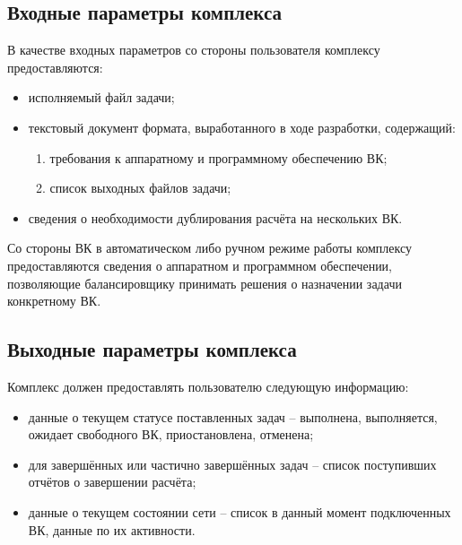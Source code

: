 \documentclass[a4paper,12pt]{report}
\numberwithin{equation}{section}
\begin{document}
\subsection{Входные параметры комплекса}
В качестве входных параметров со стороны пользователя комплексу предоставляются:
\begin{itemize}
  \item исполняемый файл задачи;
  \item текстовый документ формата, выработанного в ходе разработки, содержащий: 
  \begin{enumerate}
    \item требования к аппаратному и программному обеспечению ВК;
    \item список выходных файлов задачи;
  \end{enumerate}
  \item сведения о необходимости дублирования расчёта на нескольких ВК.
\end{itemize}

Со стороны ВК в автоматическом либо ручном режиме работы комплексу предоставляются сведения о аппаратном и программном обеспечении, 
позволяющие балансировщику принимать решения о назначении задачи конкретному ВК.

\subsection{Выходные параметры комплекса}
Комплекс должен предоставлять пользователю следующую информацию:
\begin{itemize}
  \item данные о текущем статусе поставленных задач -- выполнена, выполняется, ожидает свободного ВК, приостановлена, отменена;
  \item для завершённых или частично завершённых задач -- список поступивших отчётов о завершении расчёта;
  \item данные о текущем состоянии сети -- список в данный момент подключенных ВК, данные по их активности.
\end{itemize}
\end{document}

